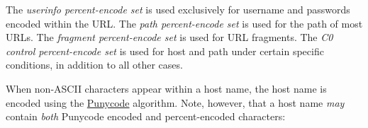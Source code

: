 The \emph{userinfo percent-encode set} is used exclusively for username
and passwords encoded within the URL. The \emph{path percent-encode set}
is used for the path of most URLs. The \emph{fragment percent-encode
set} is used for URL fragments. The \emph{C0 control percent-encode set}
is used for host and path under certain specific conditions, in addition
to all other cases.

When non-ASCII characters appear within a host name, the host name is
encoded using the
\href{https://tools.ietf.org/html/rfc5891\#section-4.4}{Punycode}
algorithm. Note, however, that a host name \emph{may} contain
\emph{both} Punycode encoded and percent-encoded characters:

\begin{Shaded}
\begin{Highlighting}[]
\OperatorTok{=}  \NormalTok{(}\NormalTok{)}\OperatorTok{;}
\NormalTok{)}\OperatorTok{;}
\NormalTok{)}\OperatorTok{;}
\end{Highlighting}
\end{Shaded}
